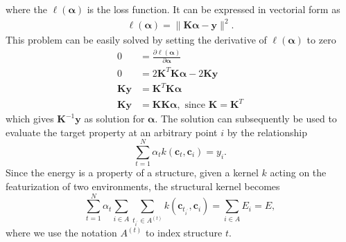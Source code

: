where the $\ell(\boldsymbol{\alpha})$ is the loss function.
It can be expressed in vectorial form as
\begin{subequations}
  \label{eq:minkernel}
  \begin{align}
    \ell(\boldsymbol{\alpha}) = \|\mathbf{K}\boldsymbol{\alpha} - \mathbf{y}\|^2.
  \end{align}
\end{subequations}
This problem can be easily solved by setting the derivative of $\ell(\boldsymbol{\alpha})$ to zero
\begin{subequations}
  \label{eq:solving_kernel}
  \begin{align}
    0 &= \frac{\partial \ell(\boldsymbol{\alpha})}{\partial\boldsymbol{\alpha}}\\
    0 &= 2\mathbf{K}^T\mathbf{K}\boldsymbol{\alpha} - 2\mathbf{K}\mathbf{y}\\
    \mathbf{K}\mathbf{y} &= \mathbf{K}^T\mathbf{K}\boldsymbol{\alpha}\\
    \mathbf{K}\mathbf{y} &= \mathbf{K}\mathbf{K}\boldsymbol{\alpha},\textrm{ since $\mathbf{K} = \mathbf{K}^T$} \label{eq:kernel_symmetry}
  \end{align}
\end{subequations}
which gives $\mathbf{K}^{-1}\mathbf{y}$ as solution for $\boldsymbol{\alpha}$.
The solution can subsequently be used to evaluate the target property at an arbitrary point $i$ by the relationship
\begin{equation}
  \label{eq:kernel_evaluation}
  \sum_{t=1}^N \alpha_t k(\mathbf{c}_t, \mathbf{c}_i) = y_i.
\end{equation}
Since the energy is a property of a structure, given a kernel $k$ acting on the featurization of two environments, the structural kernel becomes 
\begin{equation}
  \label{eq:kernel_evaluatio_ID1}
  \sum_{t=1}^N \alpha_t \sum_{i\in A} \sum_{t_{i^\prime}\in A^{(t)}} k(\mathbf{c}_{t_{i^\prime}}, \mathbf{c}_{i}) = \sum_{i\in A} E_{i} = E,
\end{equation}
where we use the notation $A^{(t)}$ to index structure $t$.
